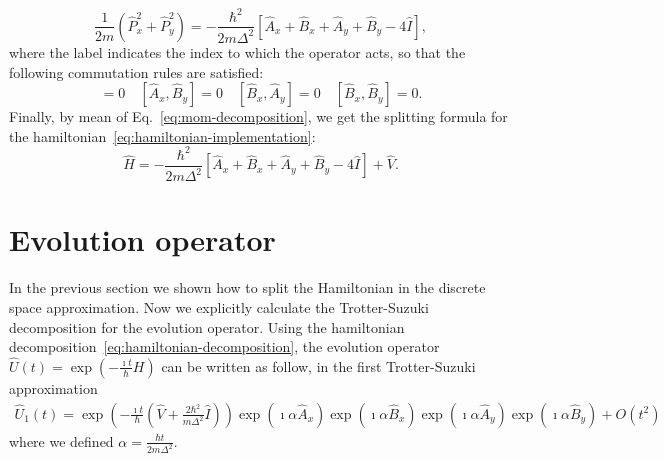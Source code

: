 \begin{equation} \label{eq:mom-decomposition}
\frac{1}{2m} \left( \hat{P}_x^2 + \hat{P}_y^2 \right)= -\frac{\hbar^2}{2m\Delta^2} \left[ \hat{A}_x + \hat{B}_x + \hat{A}_y + \hat{B}_y - 4 \hat{I} \right],
\end{equation}
where the label indicates the index to which the operator acts, so that the following commutation rules are satisfied:
\begin{equation}
[\hat{A}_x, \hat{A}_y] = 0 \quad [\hat{A}_x, \hat{B}_y] = 0 \quad [\hat{B}_x, \hat{A}_y] = 0 \quad [\hat{B}_x, \hat{B}_y] = 0.
\end{equation} 
Finally, by mean of Eq.~\eqref{eq:mom-decomposition}, we get the splitting formula for the hamiltonian~\eqref{eq:hamiltonian-implementation}:
\begin{equation} \label{eq:hamiltonian-decomposition}
\hat{H} = -\frac{\hbar^2}{2 m \Delta^2} \left[ \hat{A}_x + \hat{B}_x + \hat{A}_y + \hat{B}_y - 4 \hat{I} \right] + \hat{V}.
\end{equation}

\section{Evolution operator}
In the previous section we shown how to split the Hamiltonian in the discrete space approximation. Now we explicitly calculate the Trotter-Suzuki decomposition for the evolution operator. Using the hamiltonian decomposition~\eqref{eq:hamiltonian-decomposition}, the evolution operator $\hat{U}(t) = \exp(-\frac{\imath t}{\hbar} H)$ can be written as follow, in the first Trotter-Suzuki approximation
\begin{align}
\hat{U}_1(t) = \exp\left(-\frac{\imath t}{\hbar}\left(\hat{V} + \frac{2 \hbar^2}{m \Delta^2} \hat{I}\right) \right) \exp\left(\imath \alpha \hat{A}_x \right) \exp\left(\imath \alpha \hat{B}_x \right) \exp\left(\imath \alpha \hat{A}_y \right) \exp\left(\imath \alpha \hat{B}_y \right) + O(t^2) \label{eq:1approxTS}
\end{align}
where we defined $\alpha = \frac{\hbar t}{2m\Delta^2}$. 

